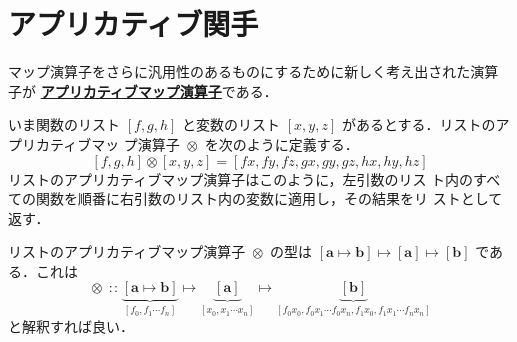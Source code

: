 \documentclass[a5paper,twoside,fleqn,draft]{jsbook}
\def\[{\left[\!\left[}
\def\]{\right]\!\right]}
\newcommand{\programminglanguage}[1]{\textsf{#1}}
\newcommand{\haskell}{\programminglanguage{Haskell}}
\newcommand{\keyword}[1]{{\underline{\textbf{#1}}}}
\newcommand{\code}[1]{\texttt{#1}}
\DeclareMathOperator{\mAppMapList}{\otimes}
\DeclareMathOperator{\mIn}{{:\!:}}
\DeclareMathOperator{\mMap}{\cdot} %
\DeclareMathOperator{\mMapList}{\odot}
\DeclareMathOperator{\mMapMaybe}{\boxdot}
\DeclareMathOperator{\mMapsTo}{\mapsto}
\newcommand{\mType}[1]{\mathbf{#1}}
\newcommand{\mListType}[1]{[\mType{#1}]}
\newcommand{\mGenericTypeAssemble}[2]{{}^{\mType{#1}}\[\mType{#2}\]}
\newcommand{\mMaybeType}[1]{\mGenericTypeAssemble{Maybe}{#1}}
\newcommand{\mListWith}[1]{\left[#1\right]}
\newcommand{\mGenericTypeClass}[1]{\textsc{#1}} %
\newcommand{\mFunctorTypeClass}{\mGenericTypeClass{Functor}}
\newcommand{\mList}[1]{{#1}^\mathrm{\star}}
\newcommand{\mMaybe}[1]{{#1}^?}
\newcommand{\mProj}[2]{#1\mMapsTo#2}
\begin{document}





\section{アプリカティブ関手}

マップ演算子をさらに汎用性のあるものにするために新しく考え出された演算子が
\keyword{アプリカティブマップ演算子}である．

いま関数のリスト $\mListWith{f,g,h}$ と変数のリスト
$\mListWith{x,y,z}$ があるとする．リストのアプリカティブマッ
プ演算子 $\mAppMapList$ を次のように定義する．
\begin{equation}
\mListWith{f,g,h}\mAppMapList\mListWith{x,y,z}
=\mListWith{fx,fy,fz,gx,gy,gz,hx,hy,hz}
\end{equation}
リストのアプリカティブマップ演算子はこのように，左引数のリス
ト内のすべての関数を順番に右引数のリスト内の変数に適用し，その結果をリ
ストとして返す．

リストのアプリカティブマップ演算子 $\mAppMapList$ の型は
$\mProj{\mListType{\mProj{\mType{a}}{\mType{b}}}}{\mProj{\mListType{\mType{a}}}{\mListType{\mType{b}}}}$
である．これは
\begin{equation}
  \mAppMapList
  \mIn\underbrace{\mListWith{\mType{a}\mapsto\mType{b}}}_{\mListWith{f_0,f_1\dotsb f_n}}
  \mapsto\underbrace{\mListType{a}}_{\mListWith{x_0,x_1\dotsb x_n}}
  \mapsto\underbrace{\mListType{\mType{b}}}_{\mListWith{f_0x_0,f_0x_1\dotsb f_0x_n,f_1x_0,f_1x_1\dotsb f_nx_n}}
\end{equation}
と解釈すれば良い．
\end{document}
